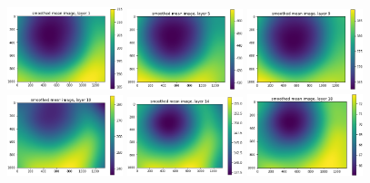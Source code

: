 \documentclass[letterpaper,11pt]{article}
\begin{document}
\begin{figure}[!ht]
\centering
\includegraphics[width=0.3\textwidth]{images/results/smoothed_mean_image_layers/smoothed_mean_image_layer_1}
\includegraphics[width=0.3\textwidth]{images/results/smoothed_mean_image_layers/smoothed_mean_image_layer_5}
\includegraphics[width=0.3\textwidth]{images/results/smoothed_mean_image_layers/smoothed_mean_image_layer_9}
\includegraphics[width=0.3\textwidth]{images/results/smoothed_mean_image_layers/smoothed_mean_image_layer_10}
\includegraphics[width=0.3\textwidth]{images/results/smoothed_mean_image_layers/smoothed_mean_image_layer_14}
\includegraphics[width=0.3\textwidth]{images/results/smoothed_mean_image_layers/smoothed_mean_image_layer_18}

\end{figure}
\end{document}
